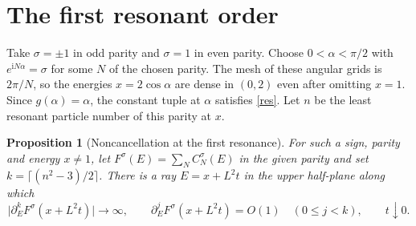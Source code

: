 \documentclass[11pt]{article}
\newtheorem{proposition}[lemma]{Proposition}
\newcommand{\ii}{\mathrm i}
\begin{document}
\section{The first resonant order}

Take $\sigma=\pm1$ in odd parity and $\sigma=1$ in even parity.
Choose $0<\alpha<\pi/2$ with $e^{\ii N\alpha}=\sigma$ for some $N$
of the chosen parity. The mesh of these angular grids is $2\pi/N$,
so the energies $x=2\cos\alpha$ are dense in $(0,2)$ even after
omitting $x=1$. Since $g(\alpha)=\alpha$, the constant tuple at
$\alpha$ satisfies \eqref{res}. Let $n$ be the least resonant
particle number of this parity at $x$.

\begin{proposition}[Noncancellation at the first resonance]\label{prop:resonance}
For such a sign, parity and energy $x\ne1$, let
$F^\sigma(E)=\sum_N C_N^\sigma(E)$ in the given parity and set
$k=\lceil(n^2-3)/2\rceil$. There is a ray $E=x+L^2t$ in the upper
half-plane along which
\[
 \bigl|\partial_E^k F^\sigma(x+L^2t)\bigr|\longrightarrow\infty,
 \qquad
 \partial_E^j F^\sigma(x+L^2t)=O(1)\quad(0\le j<k),
 \qquad t\downarrow0 .
\]
\end{proposition}
\end{document}
